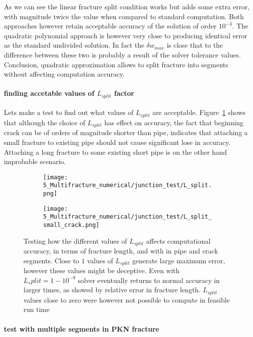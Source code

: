 As we can see the linear fracture split condition works but adds some extra error, with magnitude twice the value when compared to standard computation. Both approaches however retain acceptable accuracy of the solution of order $10^{-3}$. The quadratic polynomial approach is however very close to producing identical error as the standard undivided solution. In fact the $\delta w_{max}$ is close that to the difference between these two is probably a result of the solver tolerance values. 
Conclusion, quadratic approximation allows to split fracture into segments without affecting computation accuracy.


\paragraph{finding accetable values of $L_{split}$ factor}

Lets make a test to find out what values of $L_{split}$ are acceptable.  Figure~\ref{L_split_large} shows that although the choice of $L_{split}$ has effect on accuracy, the fact that beginning crack can be of orders of magnitude shorter than pipe, indicates that attaching a small fracture to existing pipe should not cause significant lose in accuracy. Attaching a long fracture to some existing short pipe is on the other hand improbable scenario.

\begin{figure}[H]
	\centering
	\begin{subfigure}{0.45\textwidth}
		\centering
		\texttt{[image: 5\_Multifracture\_numerical/junction\_test/L\_split.png]}
	\end{subfigure}
	\begin{subfigure}{0.45\textwidth}
		\centering
		\texttt{[image: 5\_Multifracture\_numerical/junction\_test/L\_split\_small\_crack.png]}
	\end{subfigure}
	\caption{Testing how the different values of $L_{split}$ affects computational accuracy, in terms of fracture length, and with in pipe and crack segments. Close to $1$ values of $L_{split}$ generate large maximum error, however these values might be deceptive. Even with $L_split=1-10^{-9}$ solver eventually returns to normal accuracy in larger times, as showed by relative error in fracture length. $L_{split}$ values close to zero were however not possible to compute in feasible run time}
	\label{L_split_large}
\end{figure}


\paragraph{test with multiple segments in PKN fracture}

